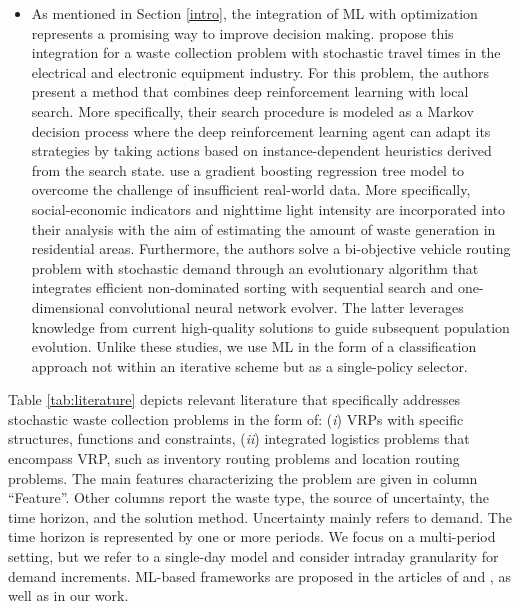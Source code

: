 \documentclass[authoryear,preprint,12pt]{elsarticle}
\begin{document}
\begin{itemize}
\item As mentioned in Section \ref{intro}, the integration of ML with optimization represents a promising way to improve decision making. \cite{Nguyen2025} propose this integration for a waste collection problem with stochastic travel times in the electrical and electronic equipment industry. For this problem, the authors present a method that combines deep reinforcement learning with local search. More specifically, their search procedure is modeled as a Markov decision process where the deep reinforcement learning agent can adapt its strategies by taking actions based on instance-dependent heuristics derived from the search state. \cite{Liao2025} use a gradient boosting regression tree  model to overcome the challenge of insufficient real-world data. More specifically, social-economic indicators and nighttime light intensity are incorporated into their analysis with the aim of estimating the amount of waste generation in residential areas. Furthermore, the authors solve a bi-objective vehicle routing problem with 
stochastic demand through an evolutionary algorithm that integrates efficient non-dominated sorting with sequential search and one-dimensional convolutional neural network evolver. The latter leverages knowledge from current high-quality solutions to guide subsequent population evolution.
Unlike these studies, we use ML in the form of a classification approach not within an iterative scheme but as a single-policy selector.    
\end{itemize}

Table \ref{tab:literature} depicts relevant literature that specifically addresses stochastic waste collection problems in the form of: (\textit{i}) VRPs with specific structures, functions and constraints,  (\textit{ii}) integrated logistics problems that encompass VRP, such as inventory routing problems and location routing problems. 
The main features characterizing the problem are given in column ``Feature''.
%
Other columns report the waste type, the source of uncertainty, the time horizon, and the solution method. 
Uncertainty mainly refers to demand. The time horizon is represented by one or more periods. We focus on a multi-period setting, but we refer to a single-day model and consider intraday granularity for demand increments. ML-based frameworks are proposed in the articles of \cite{Nguyen2025} and \cite{Liao2025}, as well as in our work.



\end{document}
